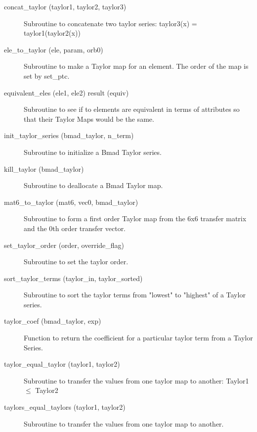 \begin{description}

\item[concat\_taylor (taylor1, taylor2, taylor3)] \Newline
Subroutine to concatenate two taylor series: taylor3(x) = taylor1(taylor2(x)) 

\item[ele\_to\_taylor (ele, param, orb0)] \Newline
Subroutine to make a Taylor map for an element. The order of the map is set by set\_ptc.

\item[equivalent\_eles (ele1, ele2) result (equiv)] \Newline 
Subroutine to see if to elements are equivalent in terms of attributes so
that their Taylor Maps would be the same. 

\item[init\_taylor\_series (bmad\_taylor, n\_term)] \Newline
Subroutine to initialize a Bmad Taylor series. 

\item[kill\_taylor (bmad\_taylor)] \Newline
Subroutine to deallocate a Bmad Taylor map. 

\item[mat6\_to\_taylor (mat6, vec0, bmad\_taylor)] \Newline
Subroutine to form a first order Taylor map from the 6x6 transfer matrix 
and the 0th order transfer vector. 

\item[set\_taylor\_order (order, override\_flag)] \Newline
Subroutine to set the taylor order. 

\item[sort\_taylor\_terms (taylor\_in, taylor\_sorted)] \Newline
Subroutine to sort the taylor terms from "lowest" to "highest" of a
Taylor series.

\item[taylor\_coef (bmad\_taylor, exp)] \Newline 
Function to return the coefficient for a particular taylor term from a
Taylor Series.

\item[taylor\_equal\_taylor (taylor1, taylor2)] \Newline
Subroutine to transfer the values from one taylor map to another:
Taylor1 $\le$ Taylor2

\item[taylors\_equal\_taylors (taylor1, taylor2)] \Newline 
Subroutine to transfer the values from one taylor map to another.


\end{description}
